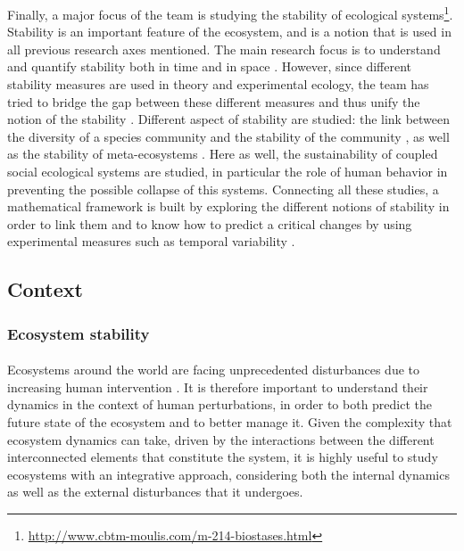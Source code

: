 \documentclass{article}
\begin{document}
Finally, a major focus of the team is studying the stability of ecological systems\footnote{\url{http://www.cbtm-moulis.com/m-214-biostases.html}}. Stability is an important feature of the ecosystem, and is a notion that is used in all previous research axes mentioned. The main research focus is to understand and quantify stability both in time and in space \citep{wang_stability_2017, zelnik_impact_2018}. However, since different stability measures are used in theory and experimental ecology, the team has tried to bridge the gap between these different measures and thus unify the notion of the stability \citep{arnold_examination_nodate}. Different aspect of stability are studied: the link between the diversity of a species community and the stability of the community \citep{vallina2017phytoplankton}, as well as the stability of meta-ecosystems \citep{arnoldi_particularity_2016, lurgi_effects_2016, wang_biodiversity_2016}.
Here as well, the sustainability of coupled social ecological systems are studied, in particular the role of human behavior in preventing the possible collapse of this systems.
Connecting all these studies, a mathematical framework is built by exploring the different notions of stability in order to link them \citep{arnoldi2016unifying, donohue_navigating_2016} and to know how to predict a critical changes by using experimental measures such as temporal variability \citep{arnoldi2016resilience, haegeman_resilience_2016, wang_invariability-area_2017}. 

\newpage


\subsection*{Context}

\subsubsection*{Ecosystem stability} %

\paragraph{}
Ecosystems around the world are facing unprecedented disturbances due to increasing human intervention \citep{oosthoek_humanity_2005}. It is therefore important to understand their dynamics in the context of human perturbations, in order to both predict the future state of the ecosystem and to better manage it.
Given the complexity that ecosystem dynamics can take, driven by the interactions between the different interconnected elements that constitute the system, it is highly useful to study ecosystems with an integrative approach, considering both the internal dynamics as well as the external disturbances that it undergoes.
\end{document}
